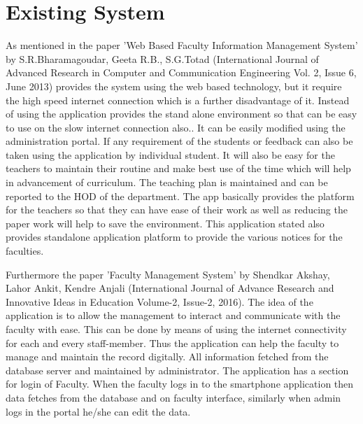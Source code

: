\documentclass[BTech]{srmuthesis}
\begin{document}
\section{Existing System}
As mentioned in the paper 'Web Based Faculty Information Management System' by
S.R.Bharamagoudar, Geeta R.B., S.G.Totad (International Journal of Advanced Research in
Computer and Communication Engineering Vol. 2, Issue 6, June 2013) \cite{einstein}provides the system
using the web based technology, but it require the high speed internet connection which is a
further disadvantage of it. Instead of using the application provides the stand alone
environment so that can be easy to use on the slow internet connection also.. It can be easily
modified using the administration portal. If any requirement of the students or feedback can
also be taken using the application by individual student. It will also be easy for the teachers to
maintain their routine and make best use of the time which will help in advancement of
curriculum. The teaching plan is maintained and can be reported to the HOD of the
department. The app basically provides the platform for the teachers so that they can have
ease of their work as well as reducing the paper work will help to save the environment. This
application stated also provides standalone application platform to provide the various notices for the faculties.

Furthermore the paper 'Faculty Management System' by Shendkar Akshay, Lahor Ankit,
Kendre Anjali (International Journal of Advance Research and Innovative Ideas in
Education Volume-2, Issue-2, 2016).\cite{einstein1} The idea of the application is to allow the management
to interact and communicate with the faculty with ease. This can be done by means of using the internet connectivity for each and every staff-member. Thus the application can help the
faculty to manage and maintain the record digitally. All information fetched from the database server and maintained by administrator. The application has a section for login of Faculty. When the faculty logs in to the smartphone application then data fetches from the database and on faculty interface, similarly when admin logs in the portal he/she can edit the data.
\end{document}
